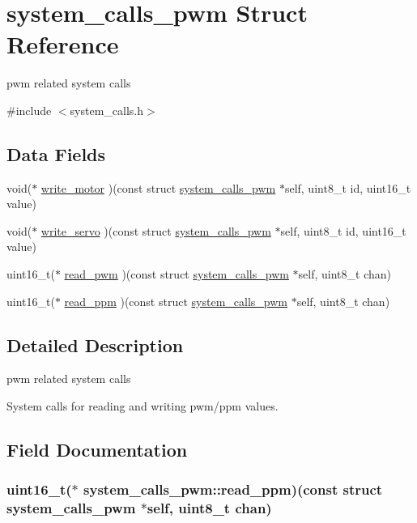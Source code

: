 \hypertarget{structsystem__calls__pwm}{\section{system\+\_\+calls\+\_\+pwm Struct Reference}
\label{structsystem__calls__pwm}
}


pwm related system calls  




{\ttfamily \#include $<$system\+\_\+calls.\+h$>$}

\subsection*{Data Fields}
\begin{DoxyCompactItemize}
\item 
void($\ast$ \hyperlink{structsystem__calls__pwm_ab4c10466eb3fc1715fd6f6705ba99c2e}{write\+\_\+motor} )(const struct \hyperlink{structsystem__calls__pwm}{system\+\_\+calls\+\_\+pwm} $\ast$self, uint8\+\_\+t id, uint16\+\_\+t value)
\item 
void($\ast$ \hyperlink{structsystem__calls__pwm_aaec55ba7b22b625dc6a6c938aea3dbdb}{write\+\_\+servo} )(const struct \hyperlink{structsystem__calls__pwm}{system\+\_\+calls\+\_\+pwm} $\ast$self, uint8\+\_\+t id, uint16\+\_\+t value)
\item 
uint16\+\_\+t($\ast$ \hyperlink{structsystem__calls__pwm_a3c15679bddb05e751416c7492157641c}{read\+\_\+pwm} )(const struct \hyperlink{structsystem__calls__pwm}{system\+\_\+calls\+\_\+pwm} $\ast$self, uint8\+\_\+t chan)
\item 
uint16\+\_\+t($\ast$ \hyperlink{structsystem__calls__pwm_af0eff23d6d84192aa6b569aca41587b3}{read\+\_\+ppm} )(const struct \hyperlink{structsystem__calls__pwm}{system\+\_\+calls\+\_\+pwm} $\ast$self, uint8\+\_\+t chan)
\end{DoxyCompactItemize}


\subsection{Detailed Description}
pwm related system calls 

System calls for reading and writing pwm/ppm values. 

\subsection{Field Documentation}
\hypertarget{structsystem__calls__pwm_af0eff23d6d84192aa6b569aca41587b3}{
\subsubsection[{read\+\_\+ppm}]{\setlength{\rightskip}{0pt plus 5cm}uint16\+\_\+t($\ast$ system\+\_\+calls\+\_\+pwm\+::read\+\_\+ppm)(const struct {\bf system\+\_\+calls\+\_\+pwm} $\ast$self, uint8\+\_\+t chan)}}\label{structsystem__calls__pwm_af0eff23d6d84192aa6b569aca41587b3}

